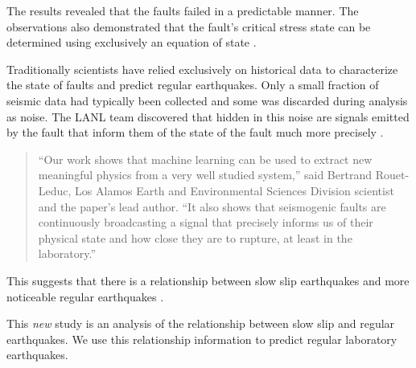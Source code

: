 \documentclass[]{llncs}
\begin{document}
The results revealed that the faults failed in a predictable manner. The observations also demonstrated that the fault’s critical stress state can be determined using exclusively an equation of state \cite{LANLNews}.\par

Traditionally scientists have relied exclusively on historical data to  characterize the state of faults and predict regular earthquakes. Only a small fraction of seismic data had typically been collected and some was discarded during analysis as noise. The LANL team discovered that hidden in this noise are signals emitted by the fault that inform them of the state of the fault much more precisely \cite{LANLNews}.\par
\begin{quote}
“Our work shows that machine learning can be used to extract new meaningful physics from a very well studied system,” said Bertrand Rouet-Leduc, Los Alamos Earth and Environmental Sciences Division scientist and the paper’s lead author. “It also shows that seismogenic faults are continuously broadcasting a signal that precisely informs us of their physical state and how close they are to rupture, at least in the laboratory.”
\end{quote}

This suggests that there is a relationship between slow slip earthquakes and more noticeable regular earthquakes \cite{SlowSlip}. 


This {\em new} study is an analysis of the relationship between slow slip and regular earthquakes. We use this relationship information to predict regular laboratory earthquakes. \par



\end{document}
